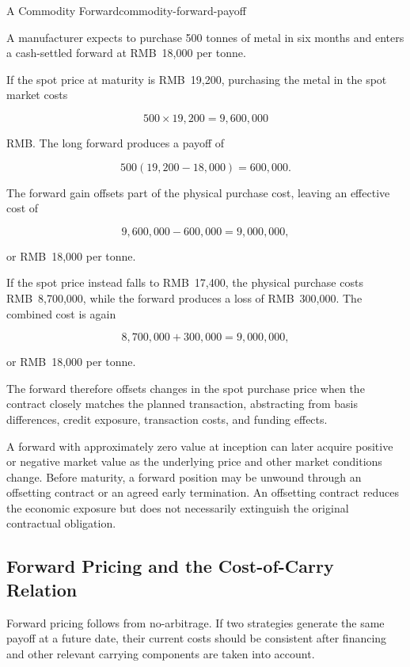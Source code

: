 \begin{example}{A Commodity Forward}{commodity-forward-payoff}

A manufacturer expects to purchase 500 tonnes of metal in six months and enters a cash-settled forward at RMB~18,000 per tonne.

If the spot price at maturity is RMB~19,200, purchasing the metal in the spot market costs

\[
500 \times 19{,}200
=
9{,}600{,}000
\]

RMB. The long forward produces a payoff of

\[
500(19{,}200-18{,}000)
=
600{,}000.
\]

The forward gain offsets part of the physical purchase cost, leaving an effective cost of

\[
9{,}600{,}000-600{,}000
=
9{,}000{,}000,
\]

or RMB~18,000 per tonne.

If the spot price instead falls to RMB~17,400, the physical purchase costs RMB~8,700,000, while the forward produces a loss of RMB~300,000. The combined cost is again

\[
8{,}700{,}000+300{,}000
=
9{,}000{,}000,
\]

or RMB~18,000 per tonne.

The forward therefore offsets changes in the spot purchase price when the contract closely matches the planned transaction, abstracting from basis differences, credit exposure, transaction costs, and funding effects.

\end{example}

A forward with approximately zero value at inception can later acquire positive or negative market value as the underlying price and other market conditions change. Before maturity, a forward position may be unwound through an offsetting contract or an agreed early termination. An offsetting contract reduces the economic exposure but does not necessarily extinguish the original contractual obligation.

\subsection{Forward Pricing and the Cost-of-Carry Relation}

Forward pricing follows from no-arbitrage. If two strategies generate the same payoff at a future date, their current costs should be consistent after financing and other relevant carrying components are taken into account.

